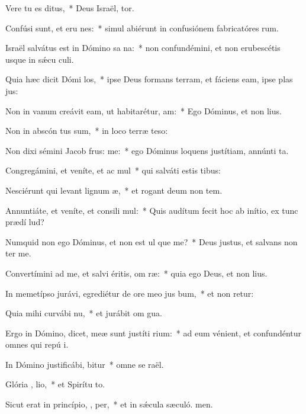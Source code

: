 \item Vere tu es  ditus,~* Deus Israël, tor.
\item Confúsi sunt, et eru nes:~* simul abiérunt in confusiónem fabricatóres rum.
\item Israël salvátus est in Dómino sa na:~* non confundémini, et non erubescétis usque in sǽcu culi.
\item Quia hæc dicit Dómi  los,~* ipse Deus formans terram, et fáciens eam, ipse plas jus:
\item Non in vanum creávit eam, ut habitarétur,  am:~* Ego Dóminus, et non  lius.
\item Non in abscón tus sum,~* in loco terræ teso:
\item Non dixi sémini Jacob frus:  me:~* ego Dóminus loquens justítiam, annúnti ta.
\item Congregámini, et veníte, et ac mul~* qui salváti estis  tibus:
\item Nesciérunt qui levant lignum  æ,~* et rogant deum non tem.
\item Annuntiáte, et veníte, et consili mul:~* Quis audítum fecit hoc ab inítio, ex tunc prædí lud?
\item Numquid non ego Dóminus, et non est ul  que me?~* Deus justus, et salvans non  ter me.
\item Convertímini ad me, et salvi éritis, om  ræ:~* quia ego Deus, et non  lius.
\item In memetípso jurávi, egrediétur de ore meo jus bum,~* et non retur:
\item Quia mihi curvábi  nu,~* et jurábit om gua.
\item Ergo in Dómino, dicet, meæ sunt justíti  rium:~* ad eum vénient, et confundéntur omnes qui repú i.
\item In Dómino justificábi,  bitur~* omne se raël.
\item Glória ,  lio,~* et Spirítu to.
\item Sicut erat in princípio,  ,  per,~* et in sǽcula sæculó. men.
